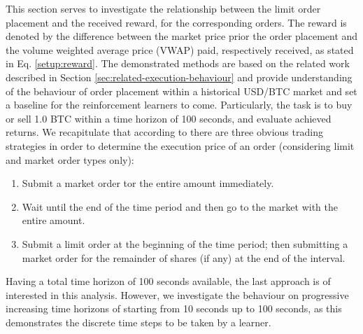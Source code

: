 This section serves to investigate the relationship between the limit order placement and the received reward, for the corresponding orders.
The reward is denoted by the difference between the market price prior the order placement and the volume weighted average price (VWAP) paid, respectively received, as stated in Eq. \ref{setup:reward}.
The demonstrated methods are based on the related work described in Section \ref{sec:related-execution-behaviour} and provide understanding of the behaviour of order placement within a historical USD/BTC market and set a baseline for the reinforcement learners to come.
Particularly, the task is to buy or sell 1.0 BTC within a time horizon of 100 seconds, and evaluate achieved returns.
We recapitulate that according to \cite{nevmyvaka2005electronic, yingsaeree2012algorithmic} there are three obvious trading strategies in order to determine the execution price of an order (considering limit and market order types only):
\begin{enumerate}
    \item Submit a market order tor the entire amount immediately.
    \item Wait until the end of the time period and then go to the market with the entire amount.
    \item Submit a limit order at the beginning of the time period; then submitting a market order for the remainder of shares (if any) at the end of the interval.
\end{enumerate}
Having a total time horizon of 100 seconds available, the last approach is of interested in this analysis.
However, we investigate the behaviour on progressive increasing time horizons of starting from 10 seconds up to 100 seconds, as this demonstrates the discrete time steps to be taken by a learner.

